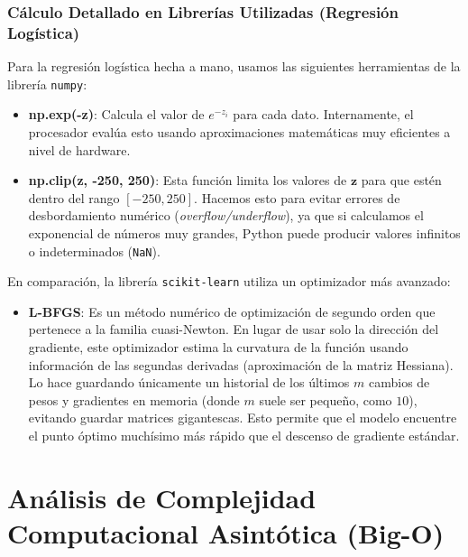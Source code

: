 \documentclass[twocolumn,10pt,journal]{IEEEtran}
\begin{document}
\subsubsection{Cálculo Detallado en Librerías Utilizadas (Regresión Logística)}
Para la regresión logística hecha a mano, usamos las siguientes herramientas de la librería \texttt{numpy}:
\begin{itemize}
    \item \textbf{np.exp(-z)}: Calcula el valor de $e^{-z_i}$ para cada dato. Internamente, el procesador evalúa esto usando aproximaciones matemáticas muy eficientes a nivel de hardware.
    \item \textbf{np.clip(z, -250, 250)}: Esta función limita los valores de $\mathbf{z}$ para que estén dentro del rango $[-250, 250]$. Hacemos esto para evitar errores de desbordamiento numérico (\textit{overflow/underflow}), ya que si calculamos el exponencial de números muy grandes, Python puede producir valores infinitos o indeterminados (\texttt{NaN}).
\end{itemize}
En comparación, la librería \texttt{scikit-learn} utiliza un optimizador más avanzado:
\begin{itemize}
    \item \textbf{L-BFGS}: Es un método numérico de optimización de segundo orden que pertenece a la familia cuasi-Newton. En lugar de usar solo la dirección del gradiente, este optimizador estima la curvatura de la función usando información de las segundas derivadas (aproximación de la matriz Hessiana). Lo hace guardando únicamente un historial de los últimos $m$ cambios de pesos y gradientes en memoria (donde $m$ suele ser pequeño, como $10$), evitando guardar matrices gigantescas. Esto permite que el modelo encuentre el punto óptimo muchísimo más rápido que el descenso de gradiente estándar.
\end{itemize}

\section{Análisis de Complejidad Computacional Asintótica (Big-O)}
\end{document}
